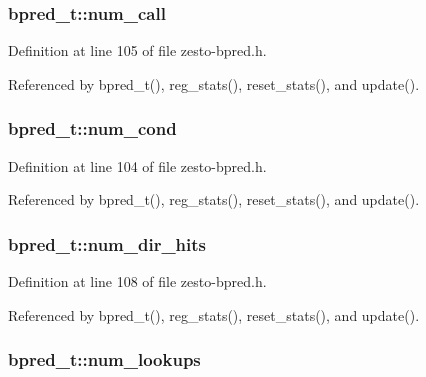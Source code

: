 \subsubsection[{num\_\-call}]{ {\bf bpred\_\-t::num\_\-call}\hspace{0.3cm}{\tt  [protected]}}\label{classbpred__t_d5a398f1789e25ad0a9af9d88d1af99c}




Definition at line 105 of file zesto-bpred.h.

Referenced by bpred\_\-t(), reg\_\-stats(), reset\_\-stats(), and update().
\subsubsection[{num\_\-cond}]{ {\bf bpred\_\-t::num\_\-cond}\hspace{0.3cm}{\tt  [protected]}}\label{classbpred__t_c16452be4da77e73e8524685b750b750}




Definition at line 104 of file zesto-bpred.h.

Referenced by bpred\_\-t(), reg\_\-stats(), reset\_\-stats(), and update().
\subsubsection[{num\_\-dir\_\-hits}]{ {\bf bpred\_\-t::num\_\-dir\_\-hits}\hspace{0.3cm}{\tt  [protected]}}\label{classbpred__t_445e72f075736ec44e7972cef6626dd9}




Definition at line 108 of file zesto-bpred.h.

Referenced by bpred\_\-t(), reg\_\-stats(), reset\_\-stats(), and update().
\subsubsection[{num\_\-lookups}]{ {\bf bpred\_\-t::num\_\-lookups}\hspace{0.3cm}{\tt  [protected]}}\label{classbpred__t_5ce0df824b86b90926f3f23147ebbf9c}




